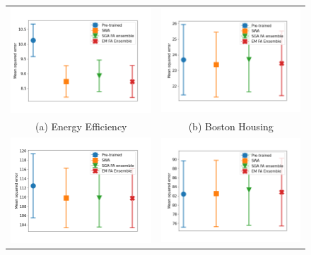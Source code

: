 \documentclass[msc,deptreport.inf]{infthesis} %
\begin{document}
\begin{figure}[!htbp] 
	\begin{tabular}{cc}
		\includegraphics[width=70mm]{plots/linear_regression_predictions_mse__energy_efficiency.png}
		& \includegraphics[width=70mm]{plots/linear_regression_predictions_mse__boston_housing.png} \\
		(a) Energy Efficiency 
		 & (b) Boston Housing \\[6pt] 
		 \includegraphics[width=70mm]{plots/linear_regression_predictions_mse__concrete_strength.png} 
		 & \includegraphics[width=70mm]{plots/linear_regression_predictions_mse__yacht_hydrodynamics.png} \\

\end{tabular}
\end{figure}
\end{document}
